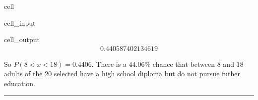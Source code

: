 \documentclass[letterpaper,10pt,english]{jupyterBook}
\begin{document}
\begin{sphinxuseclass}{cell}\begin{sphinxVerbatimInput}

\begin{sphinxuseclass}{cell_input}
\begin{sphinxVerbatim}[commandchars=\\\{\}]
\end{sphinxVerbatim}

\end{sphinxuseclass}\end{sphinxVerbatimInput}
\begin{sphinxVerbatimOutput}

\begin{sphinxuseclass}{cell_output}\begin{equation*}
\begin{split}0.440587402134619\end{split}
\end{equation*}
\end{sphinxuseclass}\end{sphinxVerbatimOutput}

\end{sphinxuseclass}
\sphinxAtStartPar
So \(P(8 < x < 18) = 0.4406\). There is a \(44.06\%\) chance that between \(8\) and \(18\) adults of the \(20\) selected have a high school diploma but do not pursue futher education.


\bigskip\hrule\bigskip
\end{document}
